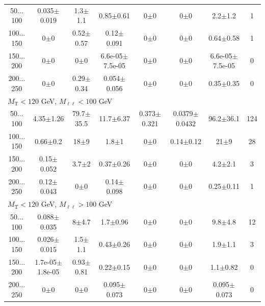 \begin{landscape}
\begin{table}
\begin{center}
\begin{tabular}{| c | c c c c c c   c | }
50$\dots$100&0.035$\pm$0.019&1.3$\pm$1.1&0.85$\pm$0.61&0$\pm$0&0$\pm$0&2.2$\pm$1.2&1\\
100$\dots$150&0$\pm$0&0.52$\pm$0.57&0.12$\pm$0.091&0$\pm$0&0$\pm$0&0.64$\pm$0.58&1\\
150$\dots$200&0$\pm$0&0$\pm$0&6.6e-05$\pm$7.5e-05&0$\pm$0&0$\pm$0&6.6e-05$\pm$7.5e-05&0\\
200$\dots$250&0$\pm$0&0.29$\pm$0.34&0.054$\pm$0.056&0$\pm$0&0$\pm$0&0.35$\pm$0.35&0\\
\hline\hline
\multicolumn{8}{l}{$M_{\text{T}} < 120$ GeV, $M_{\ell\ell} < 100$ GeV}\\\hline\hline
50$\dots$100&4.35$\pm$1.26&79.7$\pm$35.5&11.7$\pm$6.37&0.373$\pm$0.321&0.0379$\pm$0.0432&96.2$\pm$36.1&124\\
100$\dots$150&0.66$\pm$0.2&18$\pm$9&1.8$\pm$1&0$\pm$0&0.14$\pm$0.12&21$\pm$9&28\\
150$\dots$200&0.15$\pm$0.052&3.7$\pm$2&0.37$\pm$0.26&0$\pm$0&0$\pm$0&4.2$\pm$2.1&3\\
200$\dots$250&0.12$\pm$0.043&0$\pm$0&0.14$\pm$0.098&0$\pm$0&0$\pm$0&0.25$\pm$0.11&1\\
\hline\hline
\multicolumn{8}{l}{$M_{\text{T}} < 120$ GeV, $M_{\ell\ell} > 100$ GeV}\\\hline\hline
50$\dots$100&0.088$\pm$0.035&8$\pm$4.7&1.7$\pm$0.96&0$\pm$0&0$\pm$0&9.8$\pm$4.8&12\\
100$\dots$150&0.026$\pm$0.015&1.5$\pm$1.1&0.43$\pm$0.26&0$\pm$0&0$\pm$0&1.9$\pm$1.1&3\\
150$\dots$200&1.7e-05$\pm$1.8e-05&0.93$\pm$0.81&0.22$\pm$0.15&0$\pm$0&0$\pm$0&1.1$\pm$0.82&0\\
200$\dots$250&0$\pm$0&0$\pm$0&0.095$\pm$0.073&0$\pm$0&0$\pm$0&0.095$\pm$0.073&0\\
\hline\hline
\end{tabular}
\end{center}
\end{table}
\end{landscape}
